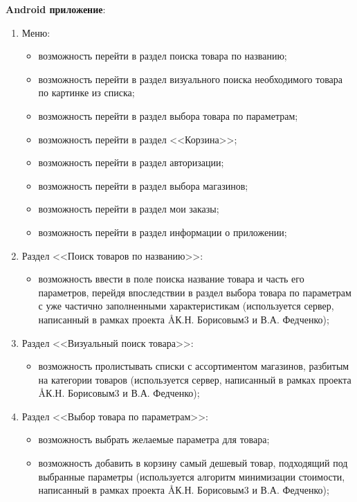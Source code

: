 \documentclass[a4paper,12pt]{article}
\begin{document}
  \noindent\textbf{Android приложение}:
  \begin{enumerate}
    \item Меню:
    \begin{itemize}
      \item возможность перейти в раздел поиска товара по названию;
      \item возможность перейти в раздел визуального поиска необходимого товара по картинке из списка;
      \item возможность перейти в раздел выбора товара по параметрам;
      \item возможность перейти в раздел <<Корзина>>;
      \item возможность перейти в раздел авторизации;
      \item возможность перейти в раздел выбора магазинов;
      \item возможность перейти в раздел мои заказы;
      \item возможность перейти в раздел информации о приложении;
    \end{itemize}
    \item Раздел <<Поиск товаров по названию>>:
    \begin{itemize}
      \item возможность ввести в поле поиска название товара и часть его параметров, перейдя впоследствии в раздел выбора товара по параметрам с уже частично заполненными характеристикам (используется сервер, написанный в рамках проекта \AA{К.Н. Борисовым}{3} и В.А. Федченко);
    \end{itemize}
    \item Раздел <<Визуальный поиск товара>>:
    \begin{itemize}
      \item возможность пролистывать списки с ассортиментом магазинов, разбитым на категории товаров (используется сервер, написанный в рамках проекта \AA{К.Н. Борисовым}{3} и В.А. Федченко);
    \end{itemize}
    \item Раздел <<Выбор товара по параметрам>>:
    \begin{itemize}
      \item возможность выбрать желаемые параметра для товара;
      \item возможность добавить в корзину самый дешевый товар, подходящий под выбранные параметры (используется алгоритм минимизации стоимости, написанный в рамках проекта \AA{К.Н. Борисовым}{3} и В.А. Федченко);
    \end{itemize}

\end{enumerate}
\end{document}
